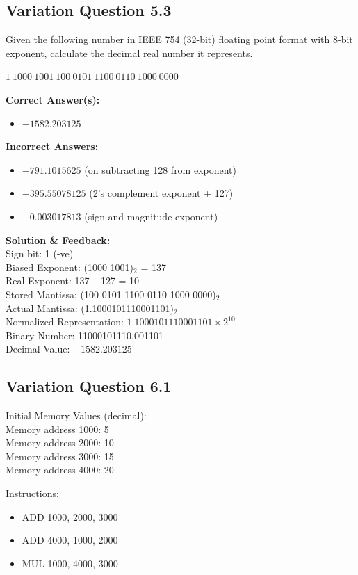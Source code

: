 \subsection{Variation Question 5.3}

Given the following number in IEEE 754 (32-bit) floating point format with 8-bit exponent, calculate the decimal real number it represents.

$1\ 1000\ 1001\ 100\ 0101\ 1100\ 0110\ 1000\ 0000$

\textbf{Correct Answer(s):}
\begin{itemize}
    \item $-1582.203125$
\end{itemize}

\textbf{Incorrect Answers:}
\begin{itemize}
    \item $-791.1015625$ (on subtracting 128 from exponent)
    \item $-395.55078125$ (2’s complement exponent + 127)
    \item $-0.003017813$ (sign-and-magnitude exponent)
\end{itemize}

\textbf{Solution \& Feedback:}\\
Sign bit: 1 (-ve)\\
Biased Exponent: (1000 1001)$_2$ = 137\\
Real Exponent: 137 – 127 = 10\\
Stored Mantissa: (100 0101 1100 0110 1000 0000)$_2$\\
Actual Mantissa: (1.1000101110001101)$_2$\\
Normalized Representation: $1.1000101110001101 \times 2^{10}$\\
Binary Number: 11000101110.001101\\
Decimal Value: $-1582.203125$


\subsection{Variation Question 6.1}

Initial Memory Values (decimal):\\
Memory address 1000: 5\\
Memory address 2000: 10\\
Memory address 3000: 15\\
Memory address 4000: 20

Instructions:
\begin{itemize}
    \item ADD 1000, 2000, 3000
    \item ADD 4000, 1000, 2000
    \item MUL 1000, 4000, 3000
\end{itemize}


